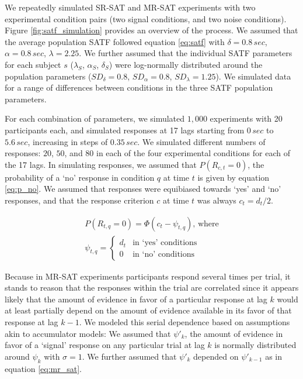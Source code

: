 \documentclass[10pt,letterpaper]{article}
\begin{document}
We repeatedly simulated SR-SAT and MR-SAT experiments with two experimental condition pairs (two signal conditions, and two noise conditions). Figure \ref{fig:satf_simulation} provides an overview of the process. We assumed that the average population SATF followed equation \ref{eq:satf} with \(\delta=0.8\,sec\), \(\alpha=0.8\,sec\), \(\lambda=2.25\). We further assumed that the individual SATF parameters for each subject \(s\) (\(\lambda_S\), \(\alpha_S\), \(\delta_S\)) were log-normally distributed around the population parameters (\(SD_{\delta}=0.8\), \(SD_{\alpha}=0.8\), \(SD_{\lambda}=1.25\)). We simulated data for a range of differences between conditions in the three SATF population parameters.



For each combination of parameters, we simulated \(1,000\) experiments with 20 participants each, and simulated responses at 17 lags starting from \(0\,sec\) to \(5.6\,sec\), increasing in steps of \(0.35\,sec\). We simulated different numbers of responses: \(20\), \(50\), and \(80\) in each of the four experimental conditions for each of the 17 lags. In simulating responses, we assumed that \(P(R_{c,t}=0)\), the probability of a `no' response in condition \(q\) at time \(t\) is given by equation \ref{eq:p_no}. We assumed that responses were equibiased towards `yes' and `no' responses, and that the response criterion $c$ at time $t$ was always $c_t = d_t/2$.  


\begin{equation}
\begin{split}
P(R_{t,q}=0) = \Phi(c_t-\psi_{t,q})\text{, where} \\
\psi_{t,q} =
        \begin{cases}
            d_t & \text{in `yes' conditions} \\
            0 & \text{in `no' conditions}
        \end{cases}
\end{split}
\label{eq:p_no}
\end{equation}


Because in MR-SAT experiments participants respond several times per
trial, it stands to reason that the responses within the trial are
correlated since it appears likely that the amount of evidence in favor
of a particular response at lag \(k\) would at least partially depend on
the amount of evidence available in its favor of that response at lag \(k-1\). We modeled this serial dependence based on assumptions akin
to accumulator models: We assumed that \(\psi'_k\), the amount of
evidence in favor of a `signal' response on any particular trial at lag
\(k\) is normally distributed around \(\psi_k\) with \(\sigma=1\). We
further assumed that \(\psi'_k\) depended on \(\psi'_{k-1}\) as in
equation \ref{eq:mr_sat}.
\end{document}
